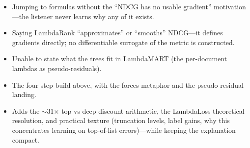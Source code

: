 \begin{interviewq}
\redflags
\begin{itemize}
    \item Jumping to formulas without the ``NDCG has no usable gradient'' motivation---the listener never learns why any of it exists.
    \item Saying LambdaRank ``approximates'' or ``smooths'' NDCG---it defines gradients directly; no differentiable surrogate of the metric is constructed.
    \item Unable to state what the trees fit in LambdaMART (the per-document lambdas as pseudo-residuals).
\end{itemize}


\goodgreat
\begin{itemize}
    \item {} The four-step build above, with the forces metaphor and the pseudo-residual landing.
    \item {} Adds the $\sim$31$\times$ top-vs-deep discount arithmetic, the LambdaLoss theoretical resolution, and practical texture (truncation levels, label gains, why this concentrates learning on top-of-list errors)---while keeping the explanation compact.
\end{itemize}

\end{interviewq}

